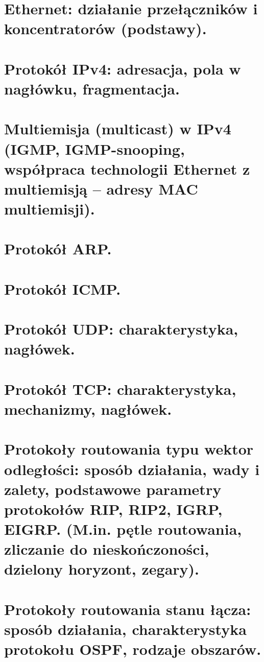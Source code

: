\documentclass{unibooklet}
\begin{document}
    \section{Ethernet: działanie przełączników i koncentratorów (podstawy).}
    

    \section{Protokół IPv4: adresacja, pola w nagłówku, fragmentacja.}
    

    \section{Multiemisja (multicast) w IPv4 (IGMP, IGMP-snooping, współpraca technologii Ethernet z
    multiemisją – adresy MAC multiemisji).}
    

    \section{Protokół ARP.}
    

    \section{Protokół ICMP.}
    

    \section{Protokół UDP: charakterystyka, nagłówek.}
    

    \section{Protokół TCP: charakterystyka, mechanizmy, nagłówek.}
    

    \section{Protokoły routowania typu wektor odległości: sposób działania, wady i zalety,
    podstawowe parametry protokołów RIP, RIP2, IGRP, EIGRP. (M.in. pętle routowania,
    zliczanie do nieskończoności, dzielony horyzont, zegary).}
    

    \section{Protokoły routowania stanu łącza: sposób działania, charakterystyka protokołu OSPF,
    rodzaje obszarów.}
    
\end{document}

